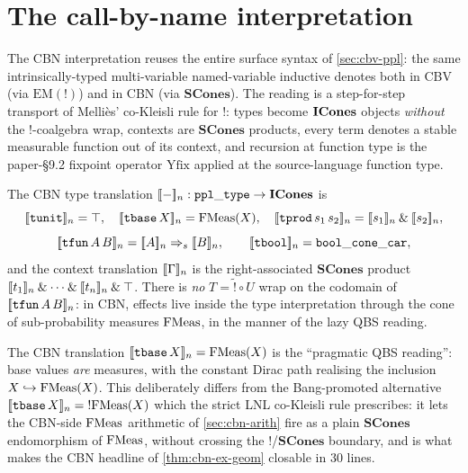 \section{The call-by-name interpretation}\label{sec:cbn-interp}

The CBN interpretation reuses the entire surface syntax
 of \autoref{sec:cbv-ppl}: the same
intrinsically-typed multi-variable named-variable inductive denotes both
in CBV (via $\mathrm{EM}(\mathord{!})$) and in CBN (via
$\mathbf{SCones}$). The reading is a step-for-step transport of
Melli\`es' co-Kleisli rule for $\mathord{!}$: types become $\mathbf{ICones}$
objects \emph{without} the $\mathord{!}$-coalgebra wrap, contexts are
$\mathbf{SCones}$ products, every term denotes a stable measurable
function out of its context, and recursion at function type is the
paper-\S9.2 fixpoint operator $\mathrm{Yfix}$ applied at the source-language
function type.

\begin{definition}\label{def:cbn-tyD}
\rocqok
{}\rocqok
{}
The CBN type translation $[\![ - ]\!]_n : \mathtt{ppl\_type} \to \mathbf{ICones}$ is
\[
  \sem{\mathtt{tunit}}_n = \top,\quad
  \sem{\mathtt{tbase}\,X}_n = \FMeas(X),\quad
  \sem{\mathtt{tprod}\,s_1\,s_2}_n = \sem{s_1}_n \mathbin{\&} \sem{s_2}_n,
\]
\[
  \sem{\mathtt{tfun}\,A\,B}_n
    = \sem{A}_n \Rightarrow_s \sem{B}_n,\qquad
  \sem{\mathtt{tbool}}_n = \mathtt{bool\_cone\_car},
\]
and the context translation $[\![ \Gamma ]\!]_n$ is the right-associated
$\mathbf{SCones}$ product $[\![ t_1 ]\!]_n \mathbin{\&} \cdots \mathbin{\&}
[\![ t_n ]\!]_n \mathbin{\&} \top$. There is \emph{no} $T = \widetilde{!}
\circ U$ wrap on the codomain of $[\![ \mathtt{tfun}\,A\,B ]\!]_n$: in CBN,
effects live inside the type interpretation through the cone of
sub-probability measures $\mathrm{FMeas}$, in the manner of the lazy
QBS reading.
\end{definition}

\begin{remark}
The CBN translation $[\![ \mathtt{tbase}\,X ]\!]_n = \mathrm{FMeas}(X)$ is the
``pragmatic QBS reading'': base values \emph{are} measures, with the
constant Dirac path realising the inclusion $X \hookrightarrow \mathrm{FMeas}(X)$.
This deliberately differs from the Bang-promoted alternative
$[\![ \mathtt{tbase}\,X ]\!]_n = \mathord{!}\mathrm{FMeas}(X)$ which the strict
LNL co-Kleisli rule prescribes: it lets the CBN-side $\mathrm{FMeas}$ arithmetic
of \autoref{sec:cbn-arith} fire as a plain $\mathbf{SCones}$ endomorphism
of $\mathrm{FMeas}$, without crossing the $\mathord{!}$/$\mathbf{SCones}$
boundary, and is what makes the CBN headline of
\autoref{thm:cbn-ex-geom} closable in 30 lines.
\end{remark}

